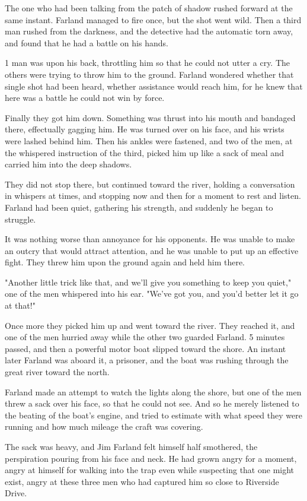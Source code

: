 \documentclass{novel}
\begin{document}
The one who had been talking from the patch of shadow rushed forward at the same instant. Farland managed to fire once, but the shot went wild. Then a third man rushed from the darkness, and the detective had the automatic torn away, and found that he had a battle on his hands.

1 man was upon his back, throttling him so that he could not utter a cry. The others were trying to throw him to the ground. Farland wondered whether that single shot had been heard, whether assistance would reach him, for he knew that here was a battle he could not win by force.

Finally they got him down. Something was thrust into his mouth and bandaged there, effectually gagging him. He was turned over on his face, and his wrists were lashed behind him. Then his ankles were fastened, and two of the men, at the whispered instruction of the third, picked him up like a sack of meal and carried him into the deep shadows.

They did not stop there, but continued toward the river, holding a conversation in whispers at times, and stopping now and then for a moment to rest and listen. Farland had been quiet, gathering his strength, and suddenly he began to struggle.

It was nothing worse than annoyance for his opponents. He was unable to make an outcry that would attract attention, and he was unable to put up an effective fight. They threw him upon the ground again and held him there.

"Another little trick like that, and we'll give you something to keep you quiet," one of the men whispered into his ear. "We've got you, and you'd better let it go at that!"

Once more they picked him up and went toward the river. They reached it, and one of the men hurried away while the other two guarded Farland. 5 minutes passed, and then a powerful motor boat slipped toward the shore. An instant later Farland was aboard it, a prisoner, and the boat was rushing through the great river toward the north.

Farland made an attempt to watch the lights along the shore, but one of the men threw a sack over his face, so that he could not see. And so he merely listened to the beating of the boat's engine, and tried to estimate with what speed they were running and how much mileage the craft was covering.

The sack was heavy, and Jim Farland felt himself half smothered, the perspiration pouring from his face and neck. He had grown angry for a moment, angry at himself for walking into the trap even while suspecting that one might exist, angry at these three men who had captured him so close to Riverside Drive.
\end{document}
